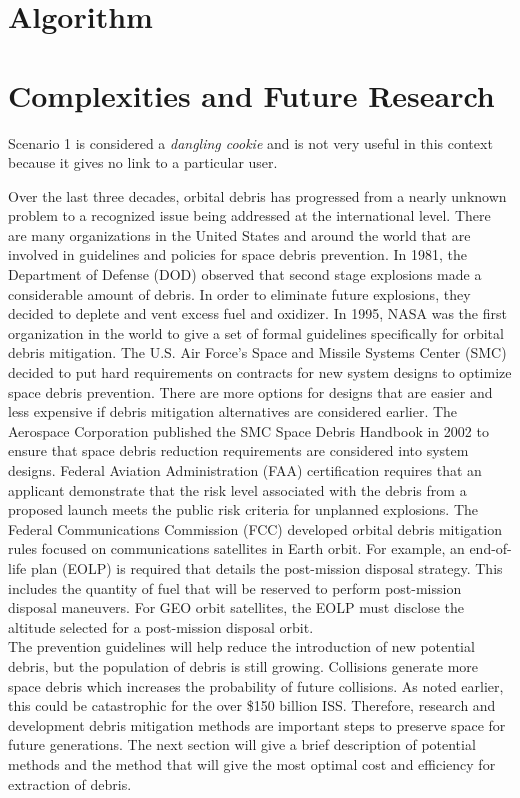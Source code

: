 \documentclass{article}
\theoremstyle{plain}			%
\theoremstyle{definition}		%
\theoremstyle{remark}
\numberwithin{equation}{section}
\numberwithin{figure}{section}
\numberwithin{table}{section}
\begin{document}
\section{Algorithm}
\section{Complexities and Future Research}
Scenario 1 is considered a \textit{dangling cookie} and is not very useful in this context because it gives no link to a particular user. 

Over the last three decades, orbital debris has progressed from a nearly unknown problem to a recognized issue being addressed at the international level. There are many organizations in the United States and around the world that are involved in guidelines and policies for space debris prevention. In 1981, the Department of Defense (DOD) observed that second stage explosions made a considerable amount of debris. In order to eliminate future explosions, they decided to deplete and vent excess fuel and oxidizer. In 1995, NASA was the first organization in the world to give a set of formal guidelines specifically for orbital debris mitigation. The U.S. Air Force's Space and Missile Systems Center (SMC) decided to put hard requirements on contracts for new system designs to optimize space debris prevention. There are more options for designs that are easier and less expensive if debris mitigation alternatives are considered earlier. The Aerospace Corporation published the SMC Space Debris Handbook in 2002 to ensure that space debris reduction requirements are considered into system designs. Federal Aviation Administration (FAA) certification requires that an applicant demonstrate that the risk level associated with the debris from a proposed launch meets the public risk criteria for unplanned explosions. The Federal Communications Commission (FCC) developed orbital debris mitigation rules focused on communications satellites in Earth orbit. For example, an end-of-life plan (EOLP) is required that details the post-mission disposal strategy. This includes the quantity of fuel that will be reserved to perform post-mission disposal maneuvers. For GEO orbit satellites, the EOLP must disclose the altitude selected for a post-mission disposal orbit.\\
   
The prevention guidelines will help reduce the introduction of new potential debris, but the population of debris is still growing. Collisions generate more space debris which increases the probability of future collisions.  As noted earlier, this could be catastrophic for the over \$150 billion ISS. Therefore, research and development debris mitigation methods are important steps to preserve space for future generations. The next section will give a brief description of potential methods and the method that will give the most optimal cost and efficiency for extraction of debris.
\end{document}
